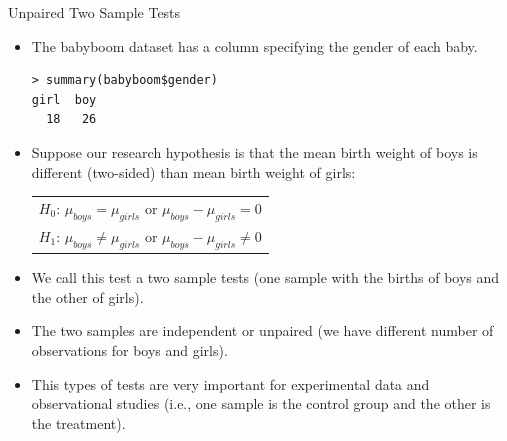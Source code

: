 \documentclass[handout]{beamer}
\begin{document}
\begin{frame}[fragile]{Unpaired Two Sample Tests}
 \scriptsize{

\begin{itemize}
 \item The babyboom dataset has a column specifying the gender of each baby.
 
 \begin{verbatim}
> summary(babyboom$gender)
girl  boy 
  18   26  
 \end{verbatim}

 
 \item Suppose our research hypothesis is that the mean birth weight of boys is different (two-sided) than mean birth weight of girls:

 \begin{table}
\center
 \begin{tabular}{c}  
$H_0$: $\mu_{boys}=\mu_{girls}$ or $\mu_{boys}-\mu_{girls}=0$  \\
$H_1$: $\mu_{boys}\neq\mu_{girls}$ or $\mu_{boys}-\mu_{girls}\neq0$
\end{tabular} 
\end{table}

\item We call this test a two sample tests (one sample with the births of boys and the other of girls).

\item The two samples are independent or unpaired (we have different number of observations for boys and girls).

\item This types of tests are very important for experimental data and observational studies (i.e., one sample is the control group and the other is the treatment).

 
\end{itemize}



}
\end{frame}
\end{document}
